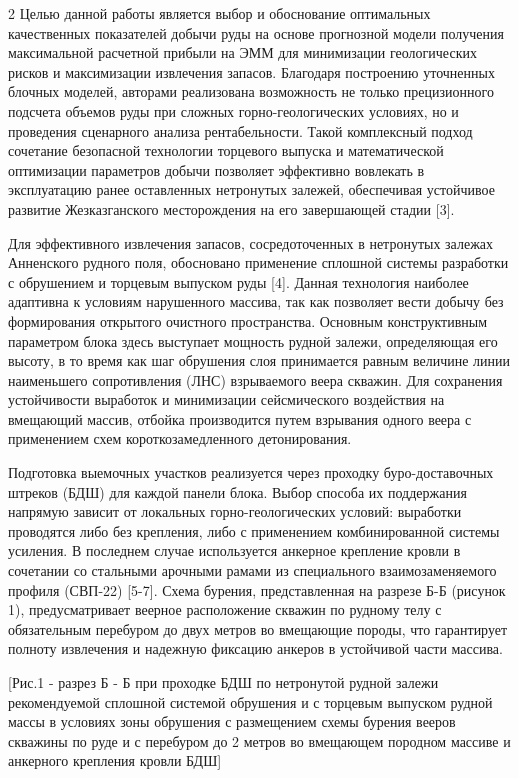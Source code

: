 \begin{multicols}{2}
Целью данной работы является выбор и обоснование оптимальных
качественных показателей добычи руды на основе прогнозной модели
получения максимальной расчетной прибыли на ЭММ для минимизации
геологических рисков и максимизации извлечения запасов. Благодаря
построению уточненных блочных моделей, авторами реализована возможность
не только прецизионного подсчета объемов руды при сложных
горно-геологических условиях, но и проведения сценарного анализа
рентабельности. Такой комплексный подход сочетание безопасной технологии
торцевого выпуска и математической оптимизации параметров добычи
позволяет эффективно вовлекать в эксплуатацию ранее оставленных
нетронутых залежей, обеспечивая устойчивое развитие Жезказганского
месторождения на его завершающей стадии {[}3{]}.

Для эффективного извлечения запасов, сосредоточенных в нетронутых
залежах Анненского рудного поля, обосновано применение сплошной системы
разработки с обрушением и торцевым выпуском руды {[}4{]}. Данная
технология наиболее адаптивна к условиям нарушенного массива, так как
позволяет вести добычу без формирования открытого очистного
пространства. Основным конструктивным параметром блока здесь выступает
мощность рудной залежи, определяющая его высоту, в то время как шаг
обрушения слоя принимается равным величине линии наименьшего
сопротивления (ЛНС) взрываемого веера скважин. Для сохранения
устойчивости выработок и минимизации сейсмического воздействия на
вмещающий массив, отбойка производится путем взрывания одного веера с
применением схем короткозамедленного детонирования.

Подготовка выемочных участков реализуется через проходку
буро-доставочных штреков (БДШ) для каждой панели блока. Выбор способа их
поддержания напрямую зависит от локальных горно-геологических условий:
выработки проводятся либо без крепления, либо с применением
комбинированной системы усиления. В последнем случае используется
анкерное крепление кровли в сочетании со стальными арочными рамами из
специального взаимозаменяемого профиля (СВП-22) {[}5-7{]}. Схема
бурения, представленная на разрезе Б-Б (рисунок 1), предусматривает
веерное расположение скважин по рудному телу с обязательным перебуром до
двух метров во вмещающие породы, что гарантирует полноту извлечения и
надежную фиксацию анкеров в устойчивой части массива.
\end{multicols}

[Рис.1 - разрез Б - Б при проходке БДШ по нетронутой рудной
залежи рекомендуемой сплошной системой обрушения и с торцевым выпуском
рудной массы в условиях зоны обрушения с размещением схемы бурения
вееров скважины по руде и с перебуром до 2 метров во вмещающем породном
массиве и анкерного крепления кровли БДШ]

